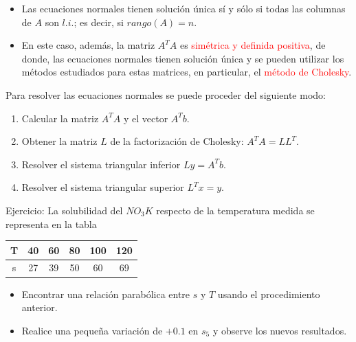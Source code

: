 \documentclass{beamer}
\begin{document}
\begin{frame}{}
 \begin{itemize}
  \item Las ecuaciones normales tienen soluci\'on \'unica  s\'i y s\'olo si todas las columnas de $A$ son $l.i.$; es 
decir, si $rango(A) = n$.
  \item<2-> En este caso, adem\'as, la matriz $A^TA$ es \textcolor{red}{sim\'etrica y definida positiva}, de donde, las 
ecuaciones normales tienen soluci\'on \'unica  y se pueden utilizar los m\'etodos  estudiados para estas matrices, en 
particular, el \textcolor{red}{m\'etodo de Cholesky}.
 \end{itemize}
\end{frame}
\begin{frame}
 Para resolver las ecuaciones normales se puede proceder del siguiente modo:
 \begin{enumerate}
  \item<2-> Calcular la matriz $A^TA$ y el vector $A^Tb$.
  \item<3-> Obtener la matriz $L$ de la factorizaci\'on de Cholesky: $A^TA = LL^T$.
  \item<4-> Resolver el sistema triangular inferior $Ly = A^Tb$.
  \item<5-> Resolver el sistema triangular superior $L^Tx = y$.
 \end{enumerate}
\end{frame}
\begin{frame}{Ejercicio:}
La solubilidad del $NO_3K$ respecto de la temperatura medida se representa en la tabla
\begin{center}
 \begin{tabular}{c|ccccc}
 T & 40 & 60 & 80 & 100 & 120 \\\hline
 s & 27 & 39 & 50 & 60 & 69
\end{tabular}
\end{center}
\begin{itemize}
 \item Encontrar una relaci\'on parab\'olica entre $s$ y $T$ usando el procedimiento anterior.
 \item Realice una peque\~na variaci\'on de $+0.1$ en $s_5$ y observe los nuevos resultados.
\end{itemize}
\end{frame}
\end{document}
